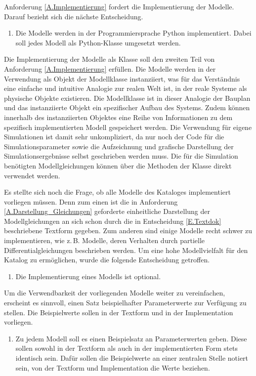 Anforderung \ref{A.Implementierung} fordert die Implementierung der Modelle. Darauf bezieht sich die nächste Entscheidung.
\begin{enumerate}[resume*]
	\item \label{E.Implementation}Die Modelle werden in der Programmiersprache Python implementiert. Dabei soll jedes Modell als Python-Klasse umgesetzt werden.
\end{enumerate}
Die Implementierung der Modelle als Klasse soll den zweiten Teil von Anforderung \ref{A.Implementierung} erfüllen. Die Modelle werden in der Verwendung als Objekt der Modellklasse instanziiert, was für das Verständnis eine einfache und intuitive Analogie zur realen Welt ist, in der reale Systeme als physische Objekte existieren. Die Modellklasse ist in dieser Analogie der Bauplan und das instanziierte Objekt ein spezifischer Aufbau des Systems. Zudem können innerhalb des instanziierten Objektes eine Reihe von Informationen zu dem spezifisch implementierten Modell gespeichert werden. Die Verwendung für eigene Simulationen ist damit sehr unkompliziert, da nur noch der Code für die Simulationsparameter sowie die Aufzeichnung und grafische Darstellung der Simulationsergebnisse selbst geschrieben werden muss. Die für die Simulation benötigten Modellgleichungen können über die Methoden der Klasse direkt verwendet werden.

Es stellte sich noch die Frage, ob alle Modelle des Kataloges implementiert vorliegen müssen. Denn zum einen ist die in Anforderung \ref{A.Darstellung_Gleichungen} geforderte einheitliche Darstellung der Modellgleichungen an sich schon durch die in Entscheidung \ref{E.Textdok} beschriebene Textform gegeben. Zum anderen sind einige Modelle recht schwer zu implementieren, wie z.\,B. Modelle, deren Verhalten durch partielle Differentialgleichungen beschrieben werden. Um eine hohe Modellvielfalt für den Katalog zu ermöglichen, wurde die folgende Entscheidung getroffen.
\begin{enumerate}[resume*]
	\item \label{E.ImplementierungOptional}Die Implementierung eines Modells ist optional.
\end{enumerate}

Um die Verwendbarkeit der vorliegenden Modelle weiter zu vereinfachen, erscheint es sinnvoll, einen Satz beispielhafter Parameterwerte zur Verfügung zu stellen. Die Beispielwerte sollen in der Textform und in der Implementation vorliegen.
\begin{enumerate}[resume*]
	\item \label{E.Parameterwerte}Zu jedem Modell soll es einen Beispielsatz an Parameterwerten geben. Diese sollen sowohl in der Textform als auch in der implementierten Form stets identisch sein. Dafür sollen die Beispielwerte an einer zentralen Stelle notiert sein, von der Textform und Implementation die Werte beziehen.
\end{enumerate}

